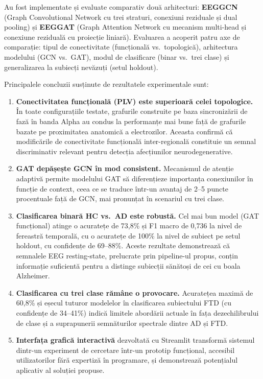 \documentclass[12pt,a4paper]{report}
\theoremstyle{definition}
\theoremstyle{remark}
\begin{document}
Au fost implementate și evaluate comparativ două arhitecturi: \textbf{EEGGCN}
(Graph Convolutional Network cu trei straturi, conexiuni reziduale și dual pooling)
și \textbf{EEGGAT} (Graph Attention Network cu mecanism multi-head și conexiune
reziduală cu proiecție liniară). Evaluarea a acoperit patru axe de comparație:
tipul de conectivitate (funcțională vs.\ topologică), arhitectura modelului
(GCN vs.\ GAT), modul de clasificare (binar vs.\ trei clase) și generalizarea
la subiecți nevăzuți (setul holdout).

Principalele concluzii susținute de rezultatele experimentale sunt:

\begin{enumerate}
    \item \textbf{Conectivitatea funcțională (PLV) este superioară celei topologice.}
    În toate configurațiile testate, grafurile construite pe baza sincronizării de
    fază în banda Alpha au condus la performanțe mai bune față de grafurile bazate
    pe proximitatea anatomică a electrozilor. Aceasta confirmă că modificările de
    conectivitate funcțională inter-regională constituie un semnal discriminativ
    relevant pentru detecția afecțiunilor neurodegenerative.

    \item \textbf{GAT depășește GCN în mod consistent.} Mecanismul de atenție
    adaptivă permite modelului GAT să diferențieze importanța conexiunilor în
    funcție de context, ceea ce se traduce într-un avantaj de 2--5 puncte
    procentuale față de GCN, mai pronunțat în scenariul cu trei clase.

    \item \textbf{Clasificarea binară HC vs.\ AD este robustă.} Cel mai bun model
    (GAT funcțional) atinge o acuratețe de 73,8\% și F1 macro de 0,736 la nivel
    de fereastră temporală, cu o acuratețe de 100\% la nivel de subiect pe setul
    holdout, cu confidențe de 69--88\%. Aceste rezultate demonstrează că
    semnalele EEG resting-state, prelucrate prin pipeline-ul propus, conțin
    informație suficientă pentru a distinge subiecții sănătoși de cei cu boala
    Alzheimer.

    \item \textbf{Clasificarea cu trei clase rămâne o provocare.} Acuratețea
    maximă de 60,8\% și eșecul tuturor modelelor în clasificarea subiectului FTD
    (cu confidențe de 34--41\%) indică limitele abordării actuale în fața
    dezechilibrului de clase și a suprapunerii semnăturilor spectrale dintre AD
    și FTD.

    \item \textbf{Interfața grafică interactivă} dezvoltată cu Streamlit
    transformă sistemul dintr-un experiment de cercetare într-un prototip
    funcțional, accesibil utilizatorilor fără expertiză în programare, și
    demonstrează potențialul aplicativ al soluției propuse.
\end{enumerate}
\end{document}
